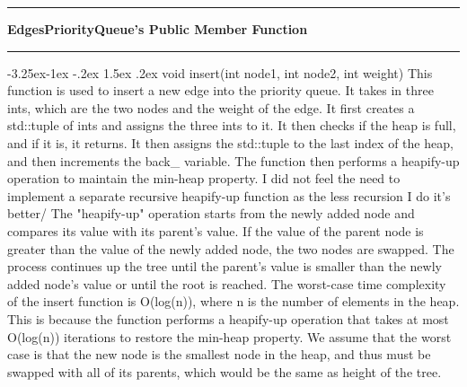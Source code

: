 \documentclass[a4paper]{article}
\makeatletter
\newcommand*{\xdash}[1][3em]{\rule[0.5ex]{#1}{0.55pt}}
\renewcommand\paragraph{\@startsection{paragraph}{4}{\z@}%
                                     {-3.25ex\@plus -1ex \@minus -.2ex}%
                                     {1.5ex \@plus .2ex}%
                                     {\normalfont\normalsize\bfseries}}
\makeatother
\begin{document}
			\begin{center}
				\xdash[6em ]\textbf{EdgesPriorityQueue's Public Member Function} \xdash[6em]
			\end{center}

			\paragraph{{\color{orange}void} {\color{draculapurple}insert}({\color{orange}int} node1, {\color{orange}int} node2, {\color{orange}int} weight)}
				This function is used to insert a new edge into the priority queue. It takes in three {\color{orange}int}s, 
				which are the two nodes and the weight of the edge. It first creates a {\color{draculapurple}std::tuple} of 
				{\color{draculapurple}int}s and assigns the three {\color{orange}int}s to it. It then checks if the heap is full, 
				and if it is, it returns. It then assigns the {\color{draculapurple}std::tuple} to the last index of the heap, 
				and then increments the {\color{Turquoise}back\_} variable.
				The function then performs a {\color{draculapurple}heapify-up} operation to maintain the min-heap property. I did not feel the need to implement a separate recursive heapify-up function as the less recursion I do it's better/
				The "{\color{draculapurple}heapify-up}" operation starts from the newly added node and compares its value with its parent's value. 
				If the value of the parent node is greater than the value of the newly added node, the two nodes are swapped.
				The process continues up the tree until the parent's value is smaller than the newly added node's value or until the root is reached.
				The worst-case time complexity of the {\color{draculapurple}insert} function is {\color{lightblue}O(log(n))}, where n is the number of elements in the heap.
				This is because the function performs a {\color{draculapurple}heapify-up} operation that takes at most {\color{lightblue}O(log(n))} 
				iterations to restore the min-heap property. We assume that the worst case is that the new node is the smallest node in the heap, and 
				thus must be swapped with all of its parents, which would be the same as height of the tree.
\end{document}
